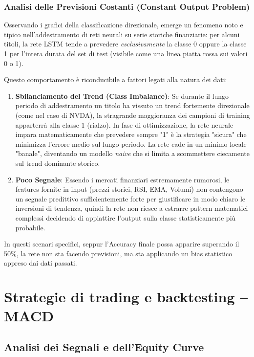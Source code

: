 \documentclass[11pt, a4paper]{report} %
\begin{document}
\subsection{Analisi delle Previsioni Costanti (Constant Output Problem)}

Osservando i grafici della classificazione direzionale, emerge un fenomeno noto e tipico nell'addestramento di reti neurali su serie storiche finanziarie: per alcuni titoli, la rete LSTM tende a prevedere \textit{esclusivamente} la classe 0 oppure la classe 1 per l'intera durata del set di test (visibile come una linea piatta rossa sui valori 0 o 1). 

Questo comportamento è riconducibile a fattori legati alla natura dei dati:
\begin{enumerate}
    \item \textbf{Sbilanciamento del Trend (Class Imbalance)}: Se durante il lungo periodo di addestramento un titolo ha vissuto un trend fortemente direzionale (come nel caso di NVDA), la stragrande maggioranza dei campioni di training apparterrà alla classe 1 (rialzo). In fase di ottimizzazione, la rete neurale impara matematicamente che prevedere sempre "1" è la strategia "sicura" che minimizza l'errore medio sul lungo periodo. La rete cade in un minimo locale "banale", diventando un modello \textit{naive} che si limita a scommettere ciecamente sul trend dominante storico.
    \item \textbf{Poco Segnale}: Essendo i mercati finanziari estremamente rumorosi, le features fornite in input (prezzi storici, RSI, EMA, Volumi) non contengono un segnale predittivo sufficientemente forte per giustificare in modo chiaro le inversioni di tendenza, quindi la rete non riesce a estrarre pattern matematici complessi decidendo di appiattire l'output sulla classe statisticamente più probabile.
\end{enumerate}

In questi scenari specifici, seppur l'Accuracy finale possa apparire superando il 50\%, la rete non sta facendo previsioni, ma sta applicando un bias statistico appreso dai dati passati.

\chapter{Strategie di trading e backtesting -- MACD}

\section{Analisi dei Segnali e dell'Equity Curve}
\end{document}
